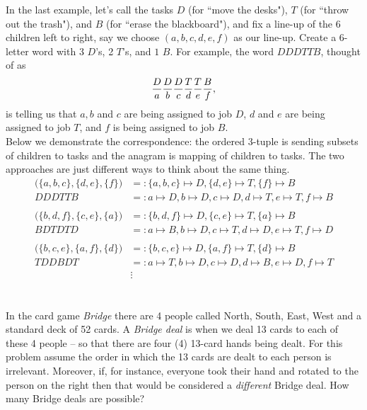 \documentclass[12pt]{article}
\begin{document}
\noindent In the last example, let's call the tasks $D$ (for ``move the desks"), $T$ (for ``throw out the trash"), and $B$ (for ``erase the blackboard"), and fix a line-up of the
6 children left to right, say we choose $(a,b,c,d,e,f)$ as our line-up.  Create a 6-letter word with 3 $D$'s, 2 $T$'s, and $1$ $B$. For example, the word $DDDTTB$, thought of as
$$\dfrac{D}{\small a}\dfrac{D}{\small b}\dfrac{D}{\small c}\dfrac{T}{\small d}\dfrac{T}{\small e}\dfrac{B}{\small f},$$
is telling us that $a,b$ and $c$ are being assigned to job $D$, $d$ and $e$ are being assigned to job $T$, and $f$ is being assigned to job $B$.\\

\noindent Below we demonstrate the correspondence: the ordered 3-tuple is sending subsets of children to tasks and the anagram is mapping of children to tasks.  The two approaches are just different ways to think about the same thing. \\

\begin{align*}
\Big( \{a,b,c\},\{d,e\},\{f\}\Big) &=: \{a,b,c\}\mapsto D, \{d,e\}\mapsto T, \{f\}\mapsto B\\
DDDTTB &=: a\mapsto D, b\mapsto D, c\mapsto D, d\mapsto T, e\mapsto T, f\mapsto B\\
&  \\
\Big( \{b,d,f\},\{c,e\},\{a\}\Big) &=: \{b,d,f\}\mapsto D, \{c,e\}\mapsto T, \{a\}\mapsto B\\
BDTDTD &=: a\mapsto B, b\mapsto D, c\mapsto T, d\mapsto D, e\mapsto T, f\mapsto D\\
&  \\
\Big( \{b,c,e\},\{a,f\},\{d\}\Big)&=: \{b,c,e\}\mapsto D, \{a,f\}\mapsto T, \{d\}\mapsto B\\
TDDBDT &=: a\mapsto T, b\mapsto D, c\mapsto D, d\mapsto B, e\mapsto D, f\mapsto T\\
&\vdots \\
\end{align*}





\newpage







\\
In the card game {\em Bridge} there are 4 people called North, South, East, West and a standard deck of 52 cards.
A {\em Bridge deal} is when we deal 13 cards to each of these 4 people -- so that there are four (4) 13-card hands being dealt.
For this problem assume the order in which the 13 cards are dealt to each person is irrelevant.  Moreover, if, for instance, everyone took their hand and
rotated to the person on the right then that would be considered a {\em different} Bridge deal.  How many Bridge deals are possible?\\
\end{document}

